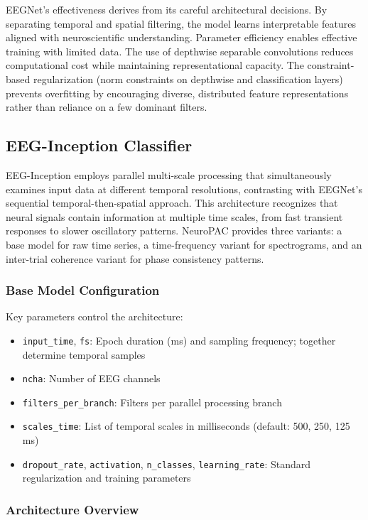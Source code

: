 \documentclass[12pt]{report}
\begin{document}
EEGNet's effectiveness derives from its careful architectural decisions. By separating temporal and spatial filtering, the model learns interpretable features aligned with neuroscientific understanding. Parameter efficiency enables effective training with limited data. The use of depthwise separable convolutions reduces computational cost while maintaining representational capacity. The constraint-based regularization (norm constraints on depthwise and classification layers) prevents overfitting by encouraging diverse, distributed feature representations rather than reliance on a few dominant filters.

\subsection{EEG-Inception Classifier}

EEG-Inception employs parallel multi-scale processing that simultaneously examines input data at different temporal resolutions, contrasting with EEGNet's sequential temporal-then-spatial approach. This architecture recognizes that neural signals contain information at multiple time scales, from fast transient responses to slower oscillatory patterns. NeuroPAC provides three variants: a base model for raw time series, a time-frequency variant for spectrograms, and an inter-trial coherence variant for phase consistency patterns.

\subsubsection{Base Model Configuration}

Key parameters control the architecture:
\begin{itemize}
  \item \verb|input_time|, \verb|fs|: Epoch duration (ms) and sampling frequency; together determine temporal samples
  \item \verb|ncha|: Number of EEG channels
  \item \verb|filters_per_branch|: Filters per parallel processing branch
  \item \verb|scales_time|: List of temporal scales in milliseconds (default: 500, 250, 125 ms)
  \item \verb|dropout_rate|, \verb|activation|, \verb|n_classes|, \verb|learning_rate|: Standard regularization and training parameters
\end{itemize}

\subsubsection{Architecture Overview}
\end{document}
